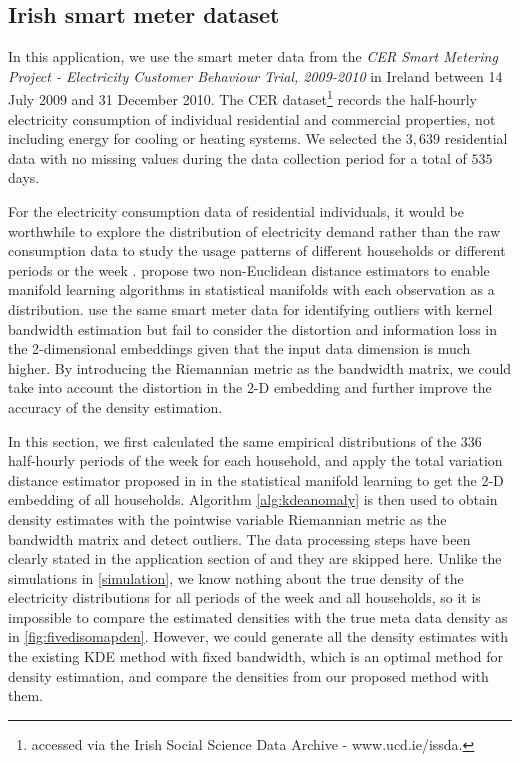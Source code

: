 \documentclass[11pt,a4paper,]{article}
\begin{document}
\hypertarget{irish-smart-meter-dataset}{%
\subsection{Irish smart meter dataset}\label{irish-smart-meter-dataset}}

In this application, we use the smart meter data from the \emph{CER Smart Metering Project - Electricity Customer Behaviour Trial, 2009-2010} in Ireland \autocite{cer2012-data} between 14 July 2009 and 31 December 2010. The CER dataset\footnote{accessed via the Irish Social Science Data Archive - www.ucd.ie/issda.} records the half-hourly electricity consumption of individual residential and commercial properties, not including energy for cooling or heating systems. We selected the \(3,639\) residential data with no missing values during the data collection period for a total of
\(535\) days.

For the electricity consumption data of residential individuals, it would be worthwhile to explore the distribution of electricity demand rather than the raw consumption data to study the usage patterns of different households or different periods or the week \autocite{Hyndman2018-ia}.
\textcite{Cheng2021-ex} propose two non-Euclidean distance estimators to enable manifold learning algorithms in statistical manifolds with each observation as a distribution. \textcite{Cheng2021-ex} use the same smart meter data for identifying outliers with kernel bandwidth estimation but fail to consider the distortion and information loss in the 2-dimensional embeddings given that the input data dimension is much higher. By introducing the Riemannian metric as the bandwidth matrix, we could take into account the distortion in the 2-D embedding and further improve the accuracy of the density estimation.

In this section, we first calculated the same empirical distributions of the \(336\) half-hourly periods of the week for each household, and apply the total variation distance estimator proposed in \textcite{Cheng2021-ex} in the statistical manifold learning to get the 2-D embedding of all households. Algorithm \ref{alg:kdeanomaly} is then used to obtain density estimates with the pointwise variable Riemannian metric as the bandwidth matrix and detect outliers. The data processing steps have been clearly
stated in the application section of \textcite{Cheng2021-ex} and they are skipped here. Unlike the simulations in \autoref{simulation}, we know nothing about the true density of the electricity distributions for all periods of the week and all households, so it is impossible to compare the estimated densities with the true meta data density as in \autoref{fig:fivedisomapden}. However, we could generate all the density estimates with the existing KDE method with fixed bandwidth, which is an optimal method for density estimation, and compare the densities from our proposed method with them.
\end{document}
